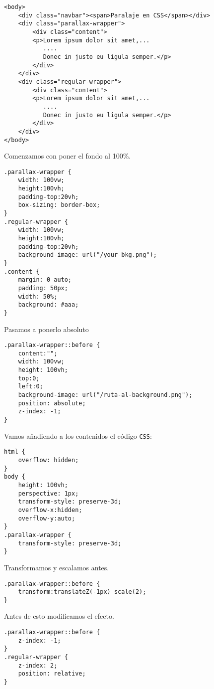 \documentclass[11pt]{article}
\begin{document}
\begin{verbatim}
<body>
	<div class="navbar"><span>Paralaje en CSS</span></div>  
	<div class="parallax-wrapper">
	    <div class="content">
		<p>Lorem ipsum dolor sit amet,... 
		   ....
		   Donec in justo eu ligula semper.</p>
	    </div>
	</div>
	<div class="regular-wrapper">
	    <div class="content">
		<p>Lorem ipsum dolor sit amet,...
		   .... 
		   Donec in justo eu ligula semper.</p>
	    </div>
	</div>
</body>
\end{verbatim}

Comenzamos con poner el fondo al 100\%.

\begin{verbatim}
.parallax-wrapper {
    width: 100vw;
    height:100vh;
    padding-top:20vh;
    box-sizing: border-box;
}
.regular-wrapper {
    width: 100vw;
    height:100vh;
    padding-top:20vh;
    background-image: url("/your-bkg.png");
}
.content {
    margin: 0 auto;
    padding: 50px;
    width: 50%;
    background: #aaa;
}
\end{verbatim}

Pasamos a ponerlo absoluto


\begin{verbatim}
.parallax-wrapper::before {
    content:"";
    width: 100vw;
    height: 100vh;
    top:0;
    left:0;
    background-image: url("/ruta-al-background.png");
    position: absolute;
    z-index: -1;
}
\end{verbatim}


Vamos añadiendo a los contenidos el código \verb~CSS~:

\begin{verbatim}
html {
    overflow: hidden;
}
body {
    height: 100vh;
    perspective: 1px;
    transform-style: preserve-3d;
    overflow-x:hidden;
    overflow-y:auto;
}
.parallax-wrapper {
    transform-style: preserve-3d;
}
\end{verbatim}


Transformamos y escalamos antes.

\begin{verbatim}
.parallax-wrapper::before {
    transform:translateZ(-1px) scale(2);
}
\end{verbatim}

Antes de esto modificamos el efecto.

\begin{verbatim}
.parallax-wrapper::before {
    z-index: -1;
}
.regular-wrapper {
    z-index: 2;
    position: relative;
}
\end{verbatim}
\end{document}
